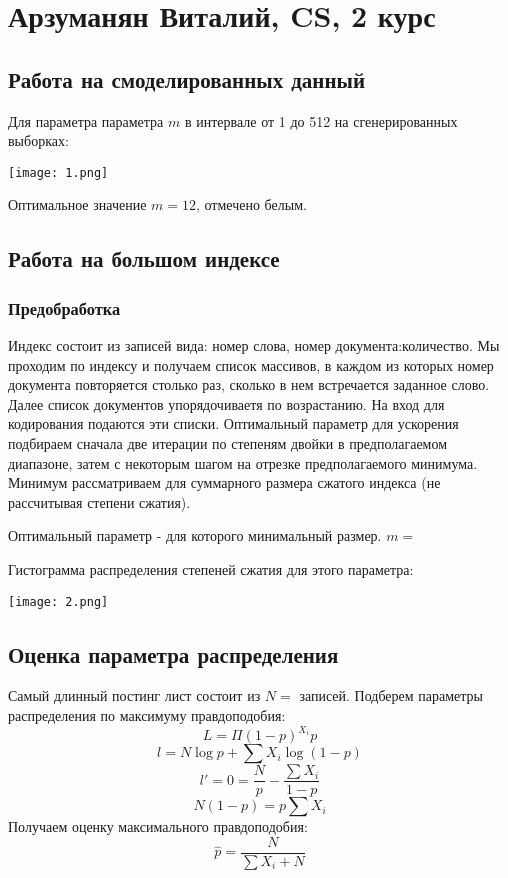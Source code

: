 \documentclass[12pt]{article}
\begin{document}
\section*{Арзуманян Виталий, CS, 2 курс}

\subsection*{Работа на смоделированных данный}
Для параметра параметра $m$ в интервале от 1 до 512 на сгенерированных выборках:

\texttt{[image: 1.png]}

Оптимальное значение $m=12$, отмечено белым.

\subsection*{Работа на большом индексе}

\subsubsection*{Предобработка}

Индекс состоит из записей вида: номер слова, номер документа:количество.
Мы проходим по индексу и получаем список массивов, в каждом из которых номер документа повторяется столько раз, сколько в нем встречается заданное слово. Далее список документов упорядочиваетя по возрастанию. На вход для кодирования подаются эти списки. Оптимальный параметр для ускорения подбираем сначала две итерации по степеням двойки в предполагаемом диапазоне, затем с некоторым шагом на отрезке предполагаемого минимума. Минимум рассматриваем для суммарного размера сжатого индекса (не рассчитывая степени сжатия).

Оптимальный параметр - для которого минимальный размер. $m = $

Гистограмма распределения степеней сжатия для этого параметра:

\texttt{[image: 2.png]}


\subsection*{Оценка параметра распределения}

Самый длинный постинг лист состоит из $N=$ записей.
Подберем параметры распределения по максимуму правдоподобия:
$$L = \Pi (1-p)^{X_i}p$$
$$l = N\log p + \sum X_i\log(1-p)$$
$$l' = 0 = \frac{N}{p} - \frac{\sum X_i}{1-p}$$
$$N(1-p) = p\sum X_i$$
Получаем оценку максимального правдоподобия:
$$\widehat{p} = \frac{N}{\sum X_i + N}$$
\end{document}

